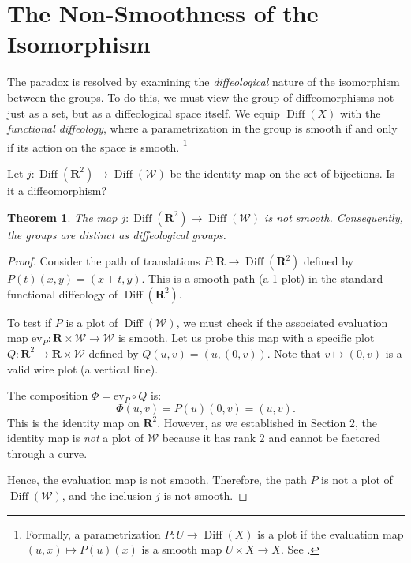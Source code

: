 \documentclass[10pt,letterpaper,reqno]{amsart}
\newcommand{\RR}{\mathbf{R}}
\newcommand{\cW}{\mathcal{W}}
\DeclareMathOperator{\Diff}{Diff}
\newtheorem{theorem}{Theorem} %
\begin{document}
  \section{The Non-Smoothness of the Isomorphism}
  
  The paradox is resolved by examining the \emph{diffeological} nature of the isomorphism between the groups.
  To do this,
  we must view the group of diffeomorphisms not just as a set,
  but as a diffeological space itself.
  We equip $\Diff(X)$ with the \emph{functional diffeology},
  where a parametrization in the group is smooth if and only if its action on the space is smooth.%
  \footnote{Formally, a parametrization $P: U \to \Diff(X)$ is a plot if the evaluation map $(u,x) \mapsto P(u)(x)$ is a smooth map $U \times X \to X$. See \cite[ and 1.61]{PIZ13}.}
  
  Let $j: \Diff(\RR^2) \to \Diff(\cW)$ be the identity map on the set of bijections.
  Is it a diffeomorphism?
  
  \begin{theorem}
    The map $j: \Diff(\RR^2) \to \Diff(\cW)$ is not smooth.
    Consequently,
    the groups are distinct as diffeological groups.
  \end{theorem}
  
  \begin{proof}
    Consider the path of translations $P: \RR \to \Diff(\RR^2)$ defined by $P(t)(x,y) = (x+t, y)$.
    This is a smooth path (a 1-plot) in the standard functional diffeology of $\Diff(\RR^2)$.
    
    To test if $P$ is a plot of $\Diff(\cW)$,
    we must check if the associated evaluation map $\text{ev}_P: \RR \times \cW \to \cW$ is smooth.
    Let us probe this map with a specific plot $Q: \RR^2 \to \RR \times \cW$ defined by $Q(u,v) = (u, (0,v))$.
    Note that $v \mapsto (0,v)$ is a valid wire plot (a vertical line).
    
    The composition $\Phi = \text{ev}_P \circ Q$ is:
    $$
      \Phi(u,v) = P(u)(0,v) = (u, v).
      $$
    This is the identity map on $\RR^2$.
    However,
    as we established in Section 2,
    the identity map is \emph{not} a plot of $\cW$ because it has rank 2 and cannot be factored through a curve.
    
    Hence,
    the evaluation map is not smooth.
    Therefore,
    the path $P$ is not a plot of $\Diff(\cW)$,
    and the inclusion $j$ is not smooth.
  \end{proof}
  
\end{document}
